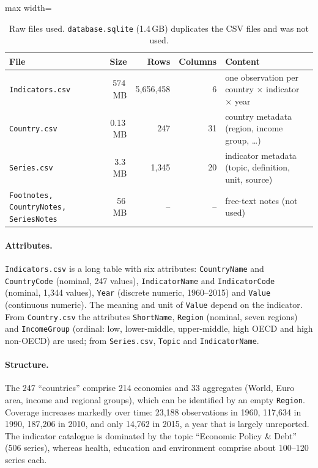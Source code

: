\documentclass[11pt,a4paper]{article}
\newcommand{\var}[1]{\texttt{#1}}
\begin{document}
\begin{table}[htbp]\centering\small
\caption{Raw files used. \texttt{database.sqlite} (1.4\,GB) duplicates the CSV files and was not used.}\label{tab:files}
\begin{adjustbox}{max width=\textwidth}\begin{tabular}{lrrrl}
\toprule
File & Size & Rows & Columns & Content \\
\midrule
\texttt{Indicators.csv} & 574\,MB & 5,656,458 & 6 & one observation per country $\times$ indicator $\times$ year \\
\texttt{Country.csv} & 0.13\,MB & 247 & 31 & country metadata (region, income group, \ldots) \\
\texttt{Series.csv} & 3.3\,MB & 1,345 & 20 & indicator metadata (topic, definition, unit, source) \\
\texttt{Footnotes, CountryNotes, SeriesNotes} & 56\,MB & -- & -- & free-text notes (not used) \\
\bottomrule
\end{tabular}\end{adjustbox}
\end{table}

\paragraph{Attributes.} \texttt{Indicators.csv} is a long table with six attributes: \var{CountryName} and \var{CountryCode} (nominal, 247 values), \var{IndicatorName} and \var{IndicatorCode} (nominal, 1,344 values), \var{Year} (discrete numeric, 1960--2015) and \var{Value} (continuous numeric). The meaning and unit of \var{Value} depend on the indicator. From \texttt{Country.csv} the attributes \var{ShortName}, \var{Region} (nominal, seven regions) and \var{IncomeGroup} (ordinal: low, lower-middle, upper-middle, high OECD and high non-OECD) are used; from \texttt{Series.csv}, \var{Topic} and \var{IndicatorName}.

\paragraph{Structure.} The 247 ``countries'' comprise 214 economies and 33 aggregates (World, Euro area, income and regional groups), which can be identified by an empty \var{Region}. Coverage increases markedly over time: 23,188 observations in 1960, 117,634 in 1990, 187,206 in 2010, and only 14,762 in 2015, a year that is largely unreported. The indicator catalogue is dominated by the topic ``Economic Policy \& Debt'' (506 series), whereas health, education and environment comprise about 100--120 series each.
\end{document}
